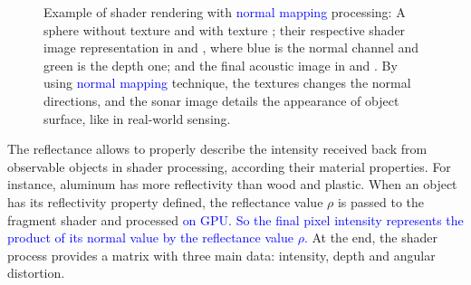 \documentclass[final,5p,times]{elsarticle}
\begin{document}
\begin{figure}[t]
{        \label{fig:normal_5}
    }
    \captionsetup{justification=centering}
    \caption{Example of shader rendering with \textcolor{blue}{normal mapping} processing:
    A sphere without texture  and with texture
    ; their respective shader image representation
    in  and , where blue is the
    normal channel and green is the depth one; and the final acoustic
    image in  and . By using
    \textcolor{blue}{normal mapping} technique, the textures changes the normal directions,
    and the sonar image details the appearance of object surface, like
    in real-world sensing.}
    \label{fig:sonar_normal_mapping}
\end{figure}

The reflectance allows to properly describe the intensity received back
from observable objects in shader processing, according their material
properties. For instance, aluminum has more reflectivity than wood and plastic.
When an object has its reflectivity property defined, the reflectance value
$\rho$ is passed to the fragment shader and processed \textcolor{blue}{on GPU. So the final
pixel intensity represents the product of its normal value by the reflectance
value $\rho$.} At the end, the shader process provides a matrix with three main
data: intensity, depth and angular distortion.
\end{document}
